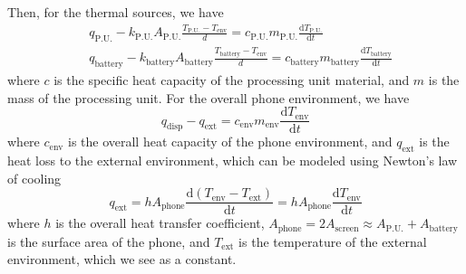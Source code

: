 \documentclass[12pt]{article}
\begin{document}
Then, for the thermal sources, we have
\begin{eqnarray}
	& q_\mathrm {P.U.}-k_\mathrm {P.U.}A_\mathrm{P.U.}\frac{T_\mathrm{P.U.}-T_\mathrm{env}}{d}=c_\mathrm{P.U.}m_\mathrm{P.U.}\frac{\mathrm dT_\mathrm{P.U.}}{\mathrm dt} \\
	& q_\mathrm {battery}-k_\mathrm {battery}A_\mathrm{battery}\frac{T_\mathrm{battery}-T_\mathrm{env}}{d}=c_\mathrm{battery}m_\mathrm{battery}\frac{\mathrm dT_\mathrm{battery}}{\mathrm dt}
\end{eqnarray}
where $c$ is the specific heat capacity of the processing unit material, and $m$ is the mass of the processing unit. For the overall phone environment, we have
\begin{equation}
	q_\mathrm{disp}-q_\mathrm{ext}=c_\mathrm{env}m_\mathrm{env}\frac{\mathrm dT_\mathrm{env}}{\mathrm dt}
\end{equation}
where $c_\mathrm{env}$ is the overall heat capacity of the phone environment, and $q_\mathrm{ext}$ is the heat loss to the external environment, which can be modeled using Newton's law of cooling
\begin{equation}
	q_\mathrm{ext}=hA_\mathrm{phone}\frac{\mathrm d(T_\mathrm{env}-T_\mathrm{ext})}{\mathrm dt}=hA_\mathrm{phone}\frac{\mathrm dT_\mathrm {env}}{\mathrm dt}
\end{equation}
where $h$ is the overall heat transfer coefficient, $A_\mathrm{phone}=2A_\mathrm{screen}\approx A_\mathrm{P.U.}+A_\mathrm{battery}$ is the surface area of the phone, and $T_\mathrm{ext}$ is the temperature of the external environment, which we see as a constant.

\end{document}
